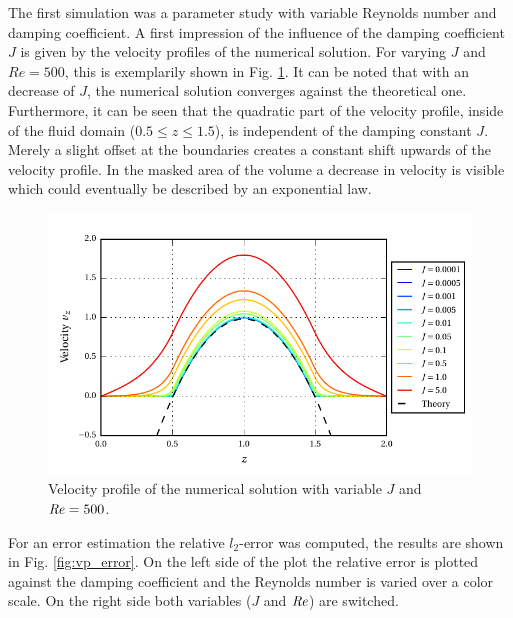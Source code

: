 The first simulation was  a parameter study with variable Reynolds number and damping coefficient.
A first impression of the influence of the damping coefficient $J$ is given by the velocity profiles of the numerical solution.
For varying $J$ and $Re=500$, this is exemplarily shown in Fig. \ref{fig:vp_flow}.
 It can be noted that with an decrease of $J$, the numerical solution converges against the theoretical one.
Furthermore, it can be seen that the quadratic part of the velocity profile,
inside of the fluid domain ($0.5\leq z \leq 1.5$), is independent of the damping constant $J$.
Merely a slight offset at the boundaries creates a constant shift upwards of the velocity profile.
In the masked area of the volume a decrease in velocity is visible which could  eventually be described by an
exponential law.

\begin{figure}[!t]
  \centering
  \includegraphics{gfx/immersed_boundary/poiseuille_flow/2_vp/vp_profile.pdf}  \caption{\label{fig:vp_flow}
    Velocity profile of the numerical solution with variable $J$ and $\mbox{\textit{Re}} = 500$.}
\end{figure}

For an error estimation the relative $l_2$-error was computed, the results are shown in Fig. \ref{fig:vp_error}.
On the left side of the plot the relative error is plotted against the damping coefficient and the Reynolds number is
varied over a color scale. On the right side both variables ($J$ and $\mbox{\textit{Re}}$) are switched.


